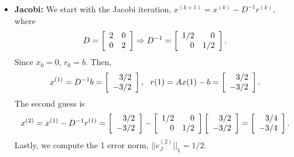 \begin{questions}
{}
\begin{solution}
\begin{itemize}
\item \textbf{Jacobi:}
We start with the Jacobi iteration, $x^{(k+1)}=x^{(k)}-D^{-1}r^{(k)}$, where
\begin{align*}
D=\left[
	\begin{array}{r r} 
	2 & 0 \\
	0 & 2 \\
	\end{array} \right]\Rightarrow D^{-1}=\left[
	\begin{array}{r r} 
	1/2 & 0 \\
	0 & 1/2 \\
	\end{array} \right].
\end{align*}
Since $x_0=0$, $r_0=b$. Then,
\begin{align*}
x^{(1)}=D^{-1}b=\left[
	\begin{array}{r r} 
	3/2 \\
	-3/2 \\
	\end{array} \right],~~r{(1)}=Ax{(1)}-b=\left[
	\begin{array}{r r} 
	3/2 \\
	-3/2 \\
	\end{array} \right].
\end{align*}
The second guess is
\begin{align*}
x^{(2)}=x^{(1)}-D^{-1}r^{(1)}=\left[
	\begin{array}{r r} 
	3/2 \\
	-3/2 \\
	\end{array} \right]-\left[
	\begin{array}{r r} 
	1/2 & 0 \\
	0 & 1/2 \\
	\end{array} \right]\left[
	\begin{array}{r r} 
	3/2 \\
	-3/2 \\
	\end{array} \right]=\left[
	\begin{array}{r r} 
	3/4 \\
	-3/4 \\
	\end{array} \right].
\end{align*}
Lastly, we compute the 1 error norm, $||e_J^{(2)}||_1=1/2$.

\end{itemize}
\end{solution}
\end{questions}
